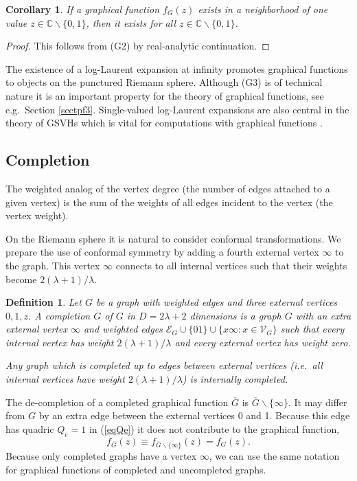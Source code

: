 \documentclass[oneside]{amsart}
\newcommand{\CC}{{\mathbb C}}
\newcommand{\Gg}{{\overline{G}}}
\newcommand{\sE}{\mathcal{E}}
\newcommand{\sV}{\mathcal{V}}
\theoremstyle{plain}
\newtheorem{cor}[thm]{Corollary}
\newtheorem{defn}[thm]{Definition}
\begin{document}
\begin{cor}
If a graphical function $f_G(z)$ exists in a neighborhood of one value $z\in\CC\backslash\{0,1\}$, then it exists for all $z\in\CC\backslash\{0,1\}$.
\end{cor}
\begin{proof}
This follows from (G2) by real-analytic continuation.
\end{proof}
The existence of a log-Laurent expansion at infinity promotes graphical functions to objects on the punctured Riemann sphere.
Although (G3) is of technical nature it is an important property for the theory of graphical functions, see e.g.\ Section \ref{sectpf3}. Single-valued log-Laurent expansions
are also central in the theory of GSVHs which is vital for computations with graphical functions \cite{GSVH}.

\subsection{Completion}\label{sectcomp}
The weighted analog of the vertex degree (the number of edges attached to a given vertex) is the sum of the weights of all edges incident to the vertex (the vertex weight).

On the Riemann sphere it is natural to consider conformal transformations. We prepare the use of conformal symmetry by adding a fourth external vertex $\infty$ to the graph.
This vertex $\infty$ connects to all internal vertices such that their weights become $2(\lambda+1)/\lambda$.

\begin{defn}\label{defcompl}
Let $G$ be a graph with weighted edges and three external vertices $0,1,z$. A completion $\Gg$ of $G$ in $D=2\lambda+2$ dimensions is a graph $G$ with an extra external vertex $\infty$ and
weighted edges $\sE_G\cup\{01\}\cup\{x\infty: x\in\sV_G\}$ such that every internal vertex has weight $2(\lambda+1)/\lambda$ and every external vertex has weight zero.

Any graph which is completed up to edges between external vertices (i.e.\ all internal vertices have weight $2(\lambda+1)/\lambda$) is internally completed.
\end{defn}

The de-completion of a completed graphical function $\Gg$ is $\Gg\backslash\{\infty\}$. It may differ from $G$ by an extra edge between the external vertices 0 and 1.
Because this edge has quadric $Q_e=1$ in (\ref{eqQe}) it does not contribute to the graphical function,
\begin{equation}
f_{\Gg}(z)\equiv f_{\Gg\backslash\{\infty\}}(z)=f_G(z).
\end{equation}
Because only completed graphs have a vertex $\infty$, we can use the same notation for graphical functions of completed and uncompleted graphs.
\end{document}
